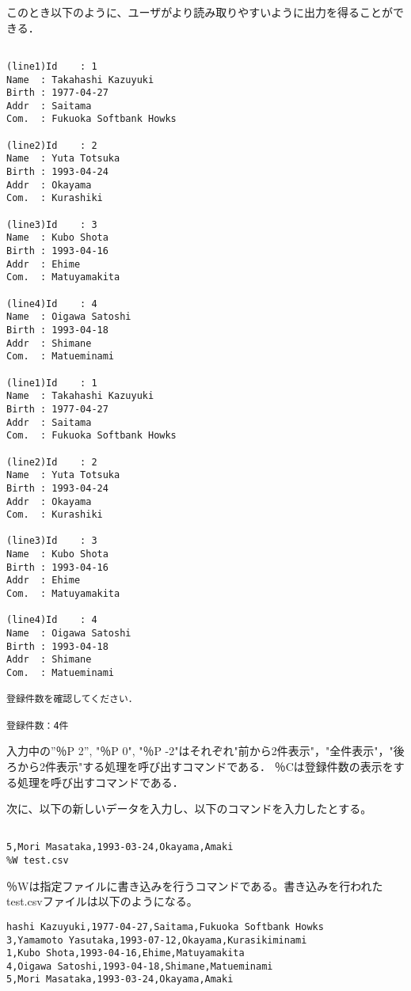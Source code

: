 \documentclass[a4j]{jarticle}
\begin{document}
このとき以下のように、ユーザがより読み取りやすいように出力を得ることができる．

{\baselineskip 3mm
\begin{verbatim}

(line1)Id    : 1
Name  : Takahashi Kazuyuki
Birth : 1977-04-27
Addr  : Saitama
Com.  : Fukuoka Softbank Howks

(line2)Id    : 2
Name  : Yuta Totsuka
Birth : 1993-04-24
Addr  : Okayama
Com.  : Kurashiki

(line3)Id    : 3
Name  : Kubo Shota
Birth : 1993-04-16
Addr  : Ehime
Com.  : Matuyamakita

(line4)Id    : 4
Name  : Oigawa Satoshi
Birth : 1993-04-18
Addr  : Shimane
Com.  : Matueminami

(line1)Id    : 1
Name  : Takahashi Kazuyuki
Birth : 1977-04-27
Addr  : Saitama
Com.  : Fukuoka Softbank Howks

(line2)Id    : 2
Name  : Yuta Totsuka
Birth : 1993-04-24
Addr  : Okayama
Com.  : Kurashiki

(line3)Id    : 3
Name  : Kubo Shota
Birth : 1993-04-16
Addr  : Ehime
Com.  : Matuyamakita

(line4)Id    : 4
Name  : Oigawa Satoshi
Birth : 1993-04-18
Addr  : Shimane
Com.  : Matueminami

登録件数を確認してください．

登録件数：4件

\end{verbatim}
}

入力中の”％P 2”, "％P 0", "％P -2"はそれぞれ"前から2件表示"，"全件表示"，"後ろから2件表示"する処理を呼び出すコマンドである．
％Cは登録件数の表示をする処理を呼び出すコマンドである．

次に、以下の新しいデータを入力し、以下のコマンドを入力したとする。

{\baselineskip 3mm
\begin{verbatim}

5,Mori Masataka,1993-03-24,Okayama,Amaki
%W test.csv

\end{verbatim}
}

％Wは指定ファイルに書き込みを行うコマンドである。書き込みを行われたtest.csvファイルは以下のようになる。

{\baselineskip 3mm
\begin{verbatim}
hashi Kazuyuki,1977-04-27,Saitama,Fukuoka Softbank Howks
3,Yamamoto Yasutaka,1993-07-12,Okayama,Kurasikiminami
1,Kubo Shota,1993-04-16,Ehime,Matuyamakita
4,Oigawa Satoshi,1993-04-18,Shimane,Matueminami
5,Mori Masataka,1993-03-24,Okayama,Amaki
\end{verbatim}
}
\end{document}
